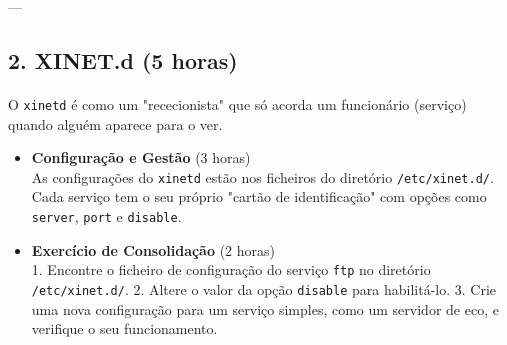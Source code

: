 \documentclass[10pt,a4paper]{article}
\newcommand{\guia}[1]{\textcolor{darkblue}{#1}} %
\begin{document}
	---
	
	\guia{
	}
	\subsection*{2. XINET.d (5 horas)}
	\vspace{-1.2em}
	\paragraph{}
	O \texttt{xinetd} é como um "rececionista" que só acorda um funcionário (serviço) quando alguém aparece para o ver.
	
	\begin{itemize}
		\item \textbf{Configuração e Gestão} (3 horas) \\
		As configurações do \texttt{xinetd} estão nos ficheiros do diretório \texttt{/etc/xinet.d/}. Cada serviço tem o seu próprio "cartão de identificação" com opções como \texttt{server}, \texttt{port} e \texttt{disable}.
		
		\item \textbf{Exercício de Consolidação} (2 horas) \\
		1. Encontre o ficheiro de configuração do serviço \texttt{ftp} no diretório \texttt{/etc/xinet.d/}.
		2. Altere o valor da opção \texttt{disable} para habilitá-lo.
		3. Crie uma nova configuração para um serviço simples, como um servidor de eco, e verifique o seu funcionamento.
	\end{itemize}
	
\end{document}
